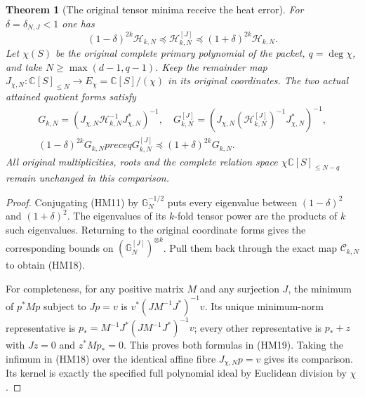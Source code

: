 \documentclass[11pt]{article}
\newcommand{\C}{\mathbb C}\newcommand{\R}{\mathbb R}
\newtheorem{theorem}{Theorem}\newtheorem{lemma}[theorem]{Lemma}
\begin{document}
\begin{theorem}[The original tensor minima receive the heat error]
For $\delta=\delta_{N,J}<1$ one has
\begin{equation}\tag{HM18}
 (1-\delta)^{2k}\mathcal H_{k,N}
 \preceq\mathcal H_{k,N}^{[J]}
 \preceq(1+\delta)^{2k}\mathcal H_{k,N}.
\end{equation}
Let $\chi(S)$ be the original complete primary polynomial of the packet,
$q=\deg\chi$, and take $N\ge\max(d-1,q-1)$. Keep the remainder map
$J_{\chi,N}:\C[S]_{\le N}\to E_\chi=\C[S]/(\chi)$ in its original
coordinates. The two actual attained quotient forms satisfy
\begin{equation}\tag{HM19}
 \begin{gathered}
 G_{k,N}=(J_{\chi,N}\mathcal H_{k,N}^{-1}J_{\chi,N}^*)^{-1},\quad
 G_{k,N}^{[J]}=(J_{\chi,N}(\mathcal H_{k,N}^{[J]})^{-1}
                                                   J_{\chi,N}^*)^{-1},\\
 (1-\delta)^{2k}G_{k,N}preceq G_{k,N}^{[J]}
                                      \preceq(1+\delta)^{2k}G_{k,N}.
 \end{gathered}
\end{equation}
All original multiplicities, roots and the complete relation space
$\chi\C[S]_{\le N-q}$ remain unchanged in this comparison.
\end{theorem}
\begin{proof}
Conjugating (HM11) by $\mathbb G_N^{-1/2}$ puts every eigenvalue
between $(1-\delta)^2$ and $(1+\delta)^2$. The eigenvalues of its
$k$-fold tensor power are the products of $k$ such eigenvalues. Returning
to the original coordinate forms gives the corresponding bounds on
$(\mathbb G_N^{[J]})^{\otimes k}$. Pull them back through the exact
map $\mathcal C_{k,N}$ to obtain (HM18).

For completeness, for any positive matrix $M$ and any surjection $J$,
the minimum of $p^*Mp$ subject to $Jp=v$ is
$v^*(JM^{-1}J^*)^{-1}v$. Its unique minimum-norm representative is
$p_*=M^{-1}J^*(JM^{-1}J^*)^{-1}v$; every other representative is
$p_*+z$ with $Jz=0$ and $z^*Mp_*=0$. This proves both formulas in
(HM19). Taking the infimum in (HM18) over the identical affine fibre
$J_{\chi,N}p=v$ gives its comparison. Its kernel is exactly the
specified full polynomial ideal by Euclidean division by $\chi$.
\end{proof}
\end{document}
